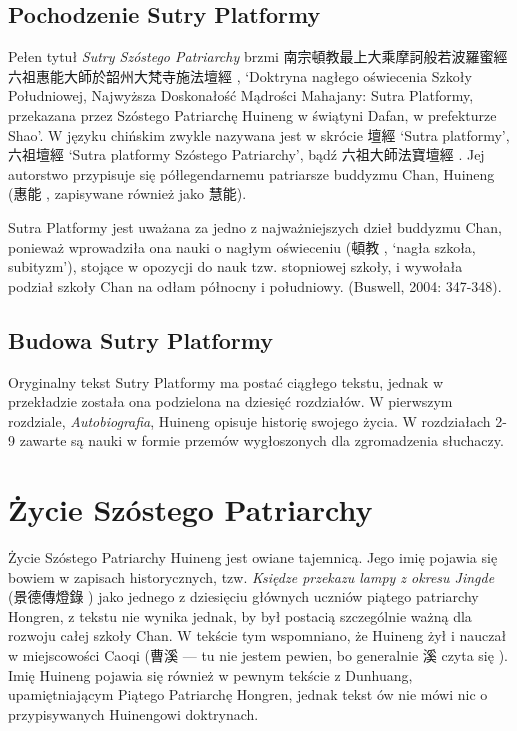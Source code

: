 \subsection{Pochodzenie Sutry Platformy}

Pełen tytuł \emph{Sutry Szóstego Patriarchy} brzmi 南宗頓教最上大乘摩訶般若波羅蜜經六祖惠能大師於韶州大梵寺施法壇經 , `Doktryna nagłego oświecenia Szkoły Południowej, Najwyższa Doskonałość Mądrości Mahajany: Sutra Platformy, przekazana przez Szóstego Patriarchę Huineng w świątyni Dafan, w prefekturze Shao'. W języku chińskim zwykle nazywana jest w skrócie 壇經  `Sutra platformy', 六祖壇經  `Sutra platformy Szóstego Patriarchy', bądź 六祖大師法寶壇經 . Jej autorstwo przypisuje się półlegendarnemu patriarsze buddyzmu Chan, Huineng (惠能 , zapisywane również jako 慧能). %

Sutra Platformy jest uważana za jedno z najważniejszych dzieł buddyzmu Chan, ponieważ wprowadziła ona nauki o nagłym oświeceniu (頓教 , `nagła szkoła, subityzm'), stojące w opozycji do nauk tzw. stopniowej szkoły, i wywołała podział szkoły Chan na odłam północny i południowy. %
(Buswell, 2004: 347-348).%

\subsection{Budowa Sutry Platformy}
Oryginalny tekst Sutry Platformy ma postać ciągłego tekstu, jednak w przekładzie została ona podzielona na dziesięć rozdziałów. W pierwszym rozdziale, \emph{Autobiografia}, Huineng opisuje historię swojego życia. W rozdziałach 2-9 zawarte są nauki w formie przemów wygłoszonych dla zgromadzenia słuchaczy. 
\fi

\section{Życie Szóstego Patriarchy}
Życie Szóstego Patriarchy Huineng jest owiane tajemnicą. Jego imię pojawia się bowiem w zapisach historycznych, tzw. \emph{Księdze przekazu lampy z okresu Jingde} (景德傳燈錄 ) jako jednego z dziesięciu głównych uczniów piątego patriarchy Hongren, z tekstu nie wynika jednak, by był postacią szczególnie ważną dla rozwoju całej szkoły Chan. W tekście tym wspomniano, że Huineng żył i nauczał w miejscowości Caoqi (曹溪  --- tu nie jestem pewien, bo generalnie 溪 czyta się ). Imię Huineng pojawia się również w pewnym tekście z Dunhuang, upamiętniającym Piątego Patriarchę Hongren, jednak tekst ów nie mówi nic o przypisywanych Huinengowi doktrynach.

